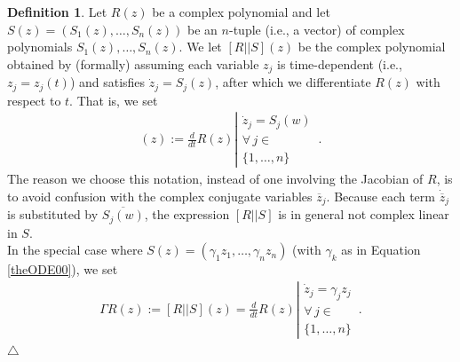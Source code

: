 \documentclass[12pt]{article}
\theoremstyle{plain}
\theoremstyle{definition}
\newtheorem{defi}[thr]{Definition}
\theoremstyle{remark}
\theoremstyle{remark}
\begin{document}
\begin{defi}\label{defibracket}
Let $R(z)$ be a complex polynomial and let $S(z) = (S_1(z), \dots, S_n(z))$ be an $n$-tuple (i.e., a vector) of complex polynomials $S_1(z), \dots, S_n(z)$. We let $[R||S](z)$ be the complex polynomial obtained by (formally) assuming each variable $z_j$ is time-dependent (i.e., $z_j = z_j(t)$) and satisfies $\dot{z}_j =   S_j(z)$, after which we differentiate $R(z)$ with respect to $t$. That is, we set
\begin{align}
    [R||S](z) :=  \frac{d}{dt}R(z)\left|{\begin{array}{l}
  \dot{z}_j =   S_j(w) \\
   \forall \, j \in \\
   \{1, \dots, n\} 
\end{array}}\right.\, .
\end{align}
The reason we choose this notation, instead of one involving the Jacobian of $R$, is to avoid confusion with the complex conjugate variables $\overline{z}_j$. Because each term $\dot{\overline{z}}_j$ is substituted by    $\overline{S_j(w)}$, the expression $[R||S]$ is in general not complex linear in $S$. \\

 In the special case where $S(z) = (\gamma_1z_1, \dots, \gamma_nz_n)$ (with $\gamma_k$ as in Equation \eqref{theODE00}), we set
\begin{align}
    \Gamma R(z) := [R||S](z) = \frac{d}{dt}R(z)\left|{\begin{array}{l}
  \dot{z}_j =   \gamma_jz_j \\
   \forall \, j \in \\
   \{1, \dots, n\} 
\end{array}}\right.\, .
\end{align}
\hfill $\triangle$
\end{defi}
\end{document}
